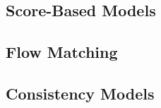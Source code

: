 \subsection{Score-Based Models}

\subsection{Flow Matching}










\subsection{Consistency Models}
